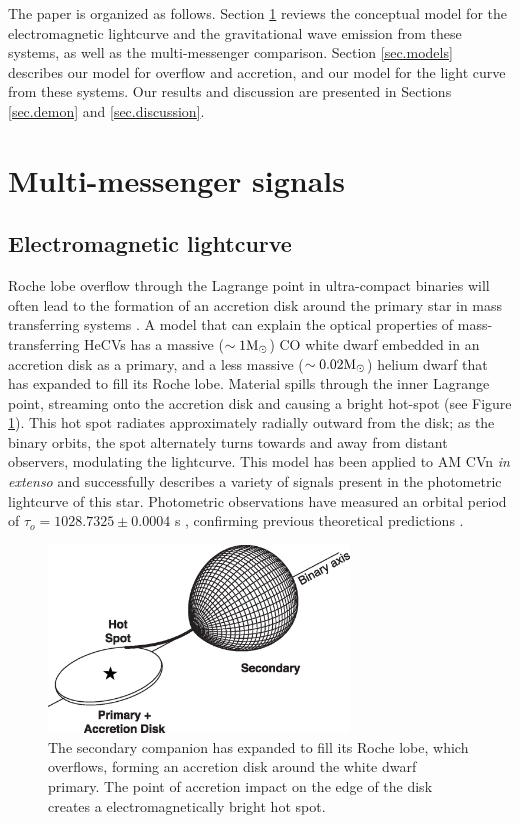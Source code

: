 \documentclass[preprint2]{aastex}
\begin{document}
The paper is organized as follows. Section \ref{sec.emGW} reviews the conceptual
model for the electromagnetic lightcurve and the gravitational wave
emission from these systems, as well as the
multi-messenger comparison.  Section \ref{sec.models} describes our
model for overflow and accretion, and our model for the light
curve from these systems.  Our results and discussion are presented in
Sections \ref{sec.demon} and \ref{sec.discussion}.

\section{Multi-messenger signals}\label{sec.emGW}

\subsection{Electromagnetic lightcurve}\label{sub.emCurve}
Roche lobe overflow through the Lagrange point in ultra-compact
binaries will often lead to the formation of an accretion disk around
the primary star in mass transferring systems
\citep{LubowShu1975,Paczynski1977}.  A model \citep{Warner1995} that
can explain the optical properties of mass-transferring {HeCVs} has
a massive ($\sim 1 \rm{M}_{\odot}$) CO white dwarf embedded in an
accretion disk as a primary, and a less massive ($\sim 0.02
\rm{M}_{\odot}$) helium dwarf that has expanded to fill its
Roche lobe.  Material spills through the inner Lagrange point,
streaming onto the accretion disk and causing a bright hot-spot (see
Figure \ref{fig.overflow}).  This hot spot radiates approximately
radially outward from the disk; as the binary orbits, the spot
alternately turns towards and away from distant observers, modulating
the lightcurve.  This model has been applied to AM CVn {\it in
extenso} \citep{FFW,PHR,PHS} and successfully describes a variety of
signals present in the photometric lightcurve of this star.
Photometric observations have measured an orbital period of $\tau_{o}
= 1028.7325 \pm 0.0004$ s \citep{1998ApJ...493L.105H}, confirming previous
theoretical predictions \citep{PHS}.

\begin{figure}[t!]
  \centering
  \includegraphics[width=80mm]{./figs/binaryModel.eps} 
  \caption{{\small The secondary companion has expanded to fill its 
  Roche lobe, which overflows, forming an accretion disk around the 
  white dwarf primary.  The point of accretion impact on the edge of 
  the disk creates a electromagnetically bright hot spot.}}
  \label{fig.overflow}
\end{figure}
\end{document}
